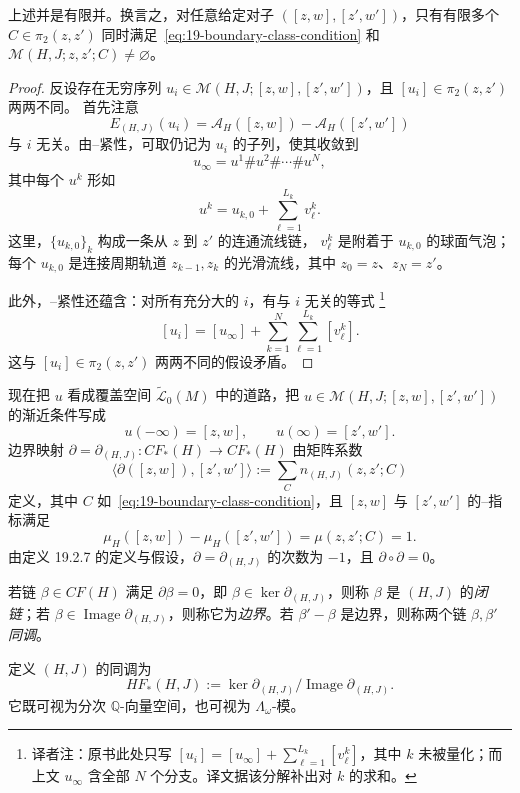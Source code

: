 \begin{lemma}
\label{lem:finitely-many-boundary-classes}
上述并是有限并。换言之，对任意给定对子 $([z,w],[z',w'])$，只有有限多个
$C\in\pi_2(z,z')$ 同时满足~\eqref{eq:19-boundary-class-condition} 和
$\mathcal M(H,J;z,z';C)\neq\varnothing$。
\end{lemma}

\begin{proof}
反设存在无穷序列
$u_i\in\mathcal M(H,J;[z,w],[z',w'])$，且 $[u_i]\in\pi_2(z,z')$ 两两不同。
首先注意
\[
 E_{(H,J)}(u_i)=\mathcal A_H([z,w])-\mathcal A_H([z',w'])
\]
与 $i$ 无关。由\personGromov{}--\personFloer{}紧性，可取仍记为 $u_i$ 的子列，使其收敛到
\[
 u_\infty=u^1\#u^2\#\cdots\#u^N,
\]
其中每个 $u^k$ 形如
\[
 u^k=u_{k,0}+\sum_{\ell=1}^{L_k}v_\ell^k.
\]
这里，$\{u_{k,0}\}_k$ 构成一条从 $z$ 到 $z'$ 的连通\personFloer{}流线链，
$v_\ell^k$ 是附着于 $u_{k,0}$ 的球面气泡；每个 $u_{k,0}$ 是连接周期轨道
$z_{k-1},z_k$ 的光滑\personFloer{}流线，其中 $z_0=z$、$z_N=z'$。

此外，\personGromov{}--\personFloer{}紧性还蕴含：对所有充分大的 $i$，有与 $i$ 无关的等式
\footnote{译者注：原书此处只写
$[u_i]=[u_\infty]+\sum_{\ell=1}^{L_k}[v_\ell^k]$，其中 $k$ 未被量化；而上文
$u_\infty$ 含全部 $N$ 个分支。译文据该分解补出对 $k$ 的求和。}
\[
 [u_i]=[u_\infty]+\sum_{k=1}^{N}\sum_{\ell=1}^{L_k}[v_\ell^k].
\]
这与 $[u_i]\in\pi_2(z,z')$ 两两不同的假设矛盾。
\end{proof}

现在把 $u$ 看成覆盖空间 $\widetilde{\mathcal L}_0(M)$ 中的道路，把
$u\in\mathcal M(H,J;[z,w],[z',w'])$ 的渐近条件写成
\begin{equation}
 u(-\infty)=[z,w],\qquad u(\infty)=[z',w'].
\label{eq:19-lifted-asymptotic-condition}
\end{equation}
\personFloer{}边界映射
$\partial=\partial_{(H,J)}:CF_*(H)\to CF_*(H)$ 由矩阵系数
\[
 \langle\partial([z,w]),[z',w']\rangle
 :=\sum_C n_{(H,J)}(z,z';C)
\]
定义，其中 $C$ 如~\eqref{eq:19-boundary-class-condition}，且 $[z,w]$ 与 $[z',w']$
的\personConley{}--\personZehnder{}指标满足
\[
 \mu_H([z,w])-\mu_H([z',w'])=\mu(z,z';C)=1.
\]
由定义 19.2.7 的定义与假设，$\partial=\partial_{(H,J)}$ 的次数为 $-1$，且
$\partial\circ\partial=0$。

\begin{definition}
\label{def:floer-cycle-boundary-homology}
若\personFloer{}链 $\beta\in CF(H)$ 满足 $\partial\beta=0$，即
$\beta\in\ker\partial_{(H,J)}$，则称 $\beta$ 是 $(H,J)$ 的\emph{\personFloer{}闭链}；若
$\beta\in\operatorname{Image}\partial_{(H,J)}$，则称它为\emph{\personFloer{}边界}。若
$\beta'-\beta$ 是边界，则称两个\personFloer{}链 $\beta,\beta'$ \emph{同调}。
\end{definition}

定义 $(H,J)$ 的\personFloer{}同调为
\[
 HF_*(H,J):=\ker\partial_{(H,J)}/\operatorname{Image}\partial_{(H,J)}.
\]
它既可视为分次 $\mathbb Q$-向量空间，也可视为 $\Lambda_\omega$-模。
